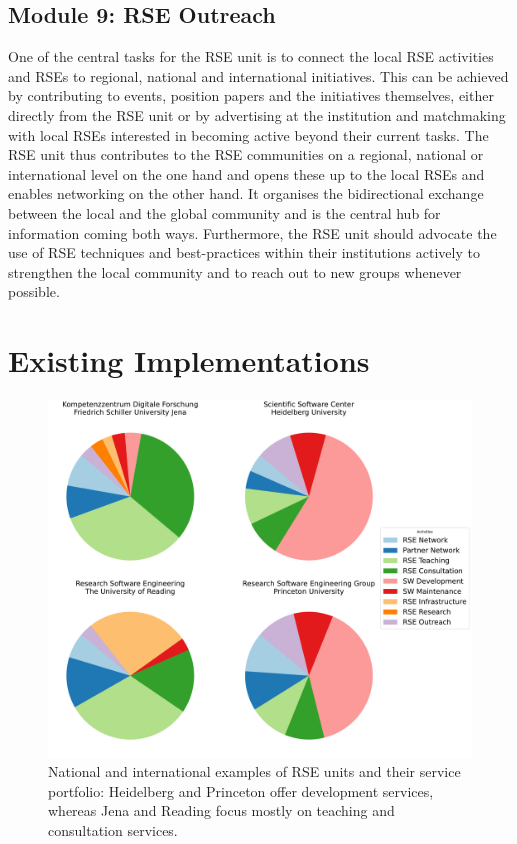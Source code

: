 \documentclass[a4paper]{article}
\begin{document}
\subsection{Module 9: RSE Outreach}%
\label{sec:outreach}

One of the central tasks for the RSE unit is to connect the local RSE activities and RSEs to regional, national and international initiatives.
This can be achieved by contributing to events, position papers and the initiatives themselves,
either directly from the RSE unit or by advertising at the institution and matchmaking with local RSEs interested in becoming active beyond their current tasks.
The RSE unit thus contributes to the RSE communities on a regional, national or international level on the one hand and opens these up to the local RSEs and enables networking on the other hand.
It organises the bidirectional exchange between the local and the global community and is the central hub for information coming both ways.
Furthermore, the RSE unit should advocate the use of RSE techniques and best-practices within their institutions actively to strengthen the local community and to reach out to new groups whenever possible.

\section{Existing Implementations}

\begin{figure}
\centering
\includegraphics[width=\textwidth]{./group_composition_plot/group_composition_plot_the_fantastic_four.pdf}
\caption{National and international examples of RSE units and their service portfolio: Heidelberg and Princeton offer development services, whereas Jena and Reading focus mostly on teaching and consultation services.}%
\label{fig:survey}
\end{figure}
\end{document}
